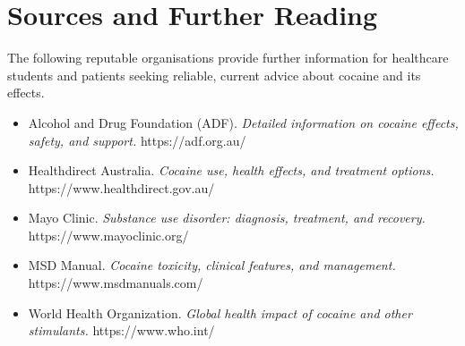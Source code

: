 \section*{Sources and Further Reading}
The following reputable organisations provide further information for healthcare students and patients seeking reliable, current advice about cocaine and its effects.

\begin{itemize}
    \item Alcohol and Drug Foundation (ADF). \textit{Detailed information on cocaine effects, safety, and support.} https://adf.org.au/
    \item Healthdirect Australia. \textit{Cocaine use, health effects, and treatment options.} https://www.healthdirect.gov.au/
    \item Mayo Clinic. \textit{Substance use disorder: diagnosis, treatment, and recovery.} https://www.mayoclinic.org/
    \item MSD Manual. \textit{Cocaine toxicity, clinical features, and management.} https://www.msdmanuals.com/
    \item World Health Organization. \textit{Global health impact of cocaine and other stimulants.} https://www.who.int/
\end{itemize}
